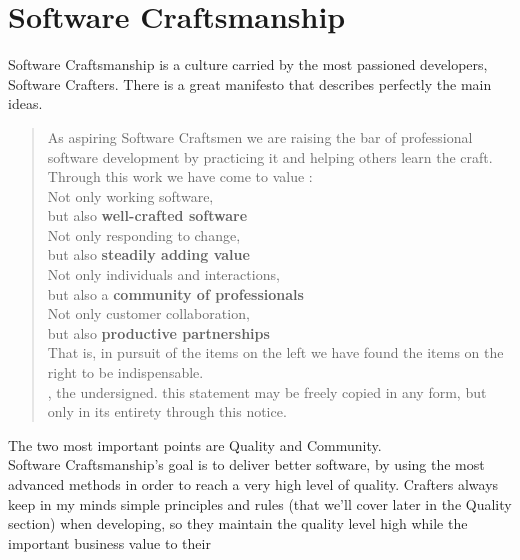 \section{Software Craftsmanship}\label{sec:software-craftsmanship}
Software Craftsmanship is a culture carried by the most passioned developers,
Software Crafters.
There is a great manifesto that describes perfectly the main ideas.

\begin{quotation}
As aspiring Software Craftsmen we are raising the bar of professional
software development by practicing it and helping others learn the craft. \\
\newline
Through this work we have come to value : \\
\newline
Not only working software, \\
\hspace*{1cm} but also \textbf{well-crafted software}\\
Not only responding to change, \\
\hspace*{1cm} but also \textbf{steadily adding value} \\
Not only individuals and interactions, \\
\hspace*{1cm} but also a \textbf{community of professionals} \\
Not only customer collaboration, \\
\hspace*{1cm} but also \textbf{productive partnerships} \\
\newline
That is, in pursuit of the items on the left we have found the items
on the right to be indispensable. \\
\newline
\small{, the undersigned.
this statement may be freely copied in any form,
but only in its entirety through this notice.}
\end{quotation}
The two most important points are Quality and Community. \\
Software Craftsmanship's goal is to deliver better software, by using the
most advanced methods in order to reach a very high level of quality.
Crafters always keep in my minds simple principles and rules
(that we'll cover later in the Quality section) when developing, so they
maintain the quality level high while the important business value to their
